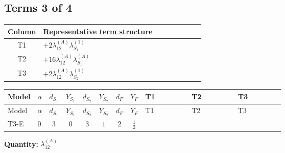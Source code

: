 \documentclass[8pt]{article}
\begin{document}
\begin{landscape}
\subsection*{Terms 3 of 4}
\begin{center}
\begin{tabular}{@{}c >{\raggedright\arraybackslash}p{0.82\linewidth}@{}}
\toprule
Column & Representative term structure \\
\midrule
T1 & \(\displaystyle +2 {\lambda_{12}^{(A)}} {\lambda_{S_1}^{(1)}}\) \\
\midrule
T2 & \(\displaystyle +16 {\lambda_{12}^{(A)}} {\lambda_{S_1}^{(A)}}\) \\
\midrule
T3 & \(\displaystyle +2 {\lambda_{12}^{(A)}} {\lambda_{S_2}^{(1)}}\) \\
\midrule
\bottomrule
\end{tabular}
\end{center}
\smallskip
\tiny
\begin{longtable}{@{}llcccccc >{\raggedright\arraybackslash}p{0.21\linewidth} >{\raggedright\arraybackslash}p{0.21\linewidth} >{\raggedright\arraybackslash}p{0.21\linewidth}@{}}
\toprule
Model & $\alpha$ & $d_{S_1}$ & $Y_{S_1}$ & $d_{S_2}$ & $Y_{S_2}$ & $d_F$ & $Y_F$ & T1 & T2 & T3 \\
\midrule
\endfirsthead
\toprule
Model & $\alpha$ & $d_{S_1}$ & $Y_{S_1}$ & $d_{S_2}$ & $Y_{S_2}$ & $d_F$ & $Y_F$ & T1 & T2 & T3 \\
\midrule
\endhead
T3-E & $0$ & $3$ & $0$ & $3$ & $1$ & $2$ & $\frac{1}{2}$ & \scriptsize\adjustbox{max width=\linewidth}{$\begin{gathered} +2 {\lambda_{12}^{(A)}} {\lambda_{S_1}^{(1)}}\end{gathered}$} & \scriptsize\adjustbox{max width=\linewidth}{$\begin{gathered} +16 {\lambda_{12}^{(A)}} {\lambda_{S_1}^{(A)}}\end{gathered}$} & \scriptsize\adjustbox{max width=\linewidth}{$\begin{gathered} +2 {\lambda_{12}^{(A)}} {\lambda_{S_2}^{(1)}}\end{gathered}$} \\
\midrule
\bottomrule
\end{longtable}
\clearpage
\noindent\textbf{Quantity: }$\lambda_{12}^{(A)}$\par\smallskip

\end{landscape}
\end{document}

